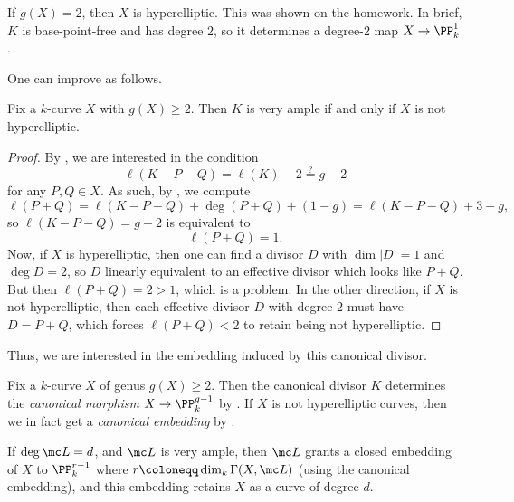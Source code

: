 \documentclass[../notes.tex]{subfiles}
\begin{document}
\begin{remark}
	If $g(X)=2$, then $X$ is hyperelliptic. This was shown on the homework. In brief, $K$ is base-point-free and has degree $2$, so it determines a degree-$2$ map $X\to\PP^1_k$.
\end{remark}
One can improve  as follows.
\begin{proposition} \label{prop:k-is-very-ample}
	Fix a $k$-curve $X$ with $g(X)\ge2$. Then $K$ is very ample if and only if $X$ is not hyperelliptic.
\end{proposition}
\begin{proof}
	By , we are interested in the condition
	\[\ell(K-P-Q)=\ell(K)-2\stackrel?=g-2\]
	for any $P,Q\in X$. As such, by , we compute
	\[\ell(P+Q)=\ell(K-P-Q)+\deg(P+Q)+(1-g)=\ell(K-P-Q)+3-g,\]
	so $\ell(K-P-Q)=g-2$ is equivalent to
	\[\ell(P+Q)=1.\]
	Now, if $X$ is hyperelliptic, then one can find a divisor $D$ with $\dim|D|=1$ and $\deg D=2$, so $D$ linearly equivalent to an effective divisor which looks like $P+Q$. But then $\ell(P+Q)=2>1$, which is a problem. In the other direction, if $X$ is not hyperelliptic, then each effective divisor $D$ with degree $2$ must have $D=P+Q$, which forces $\ell(P+Q)<2$ to retain being not hyperelliptic.
\end{proof}
Thus, we are interested in the embedding induced by this canonical divisor.
\begin{definition}
	Fix a $k$-curve $X$ of genus $g(X)\ge2$. Then the canonical divisor $K$ determines the \textit{canonical morphism} $X\to\PP^{g-1}_k$ by . If $X$ is not hyperelliptic curves, then we in fact get a \textit{canonical embedding} by .
\end{definition}
\begin{remark}
	If $\deg\mc L=d$, and $\mc L$ is very ample, then $\mc L$ grants a closed embedding of $X$ to $\PP^{r-1}_k$ where $r\coloneqq\dim_k\Gamma(X,\mc L)$ (using the canonical embedding), and this embedding retains $X$ as a curve of degree $d$.
\end{remark}
\end{document}
